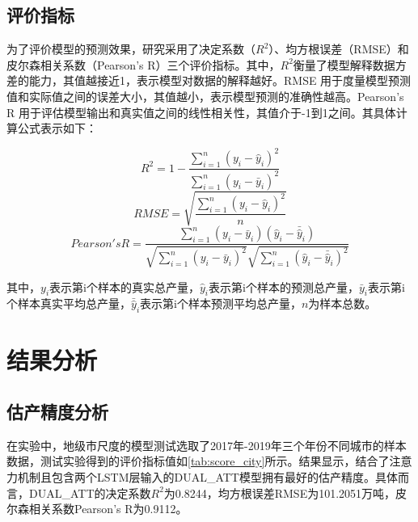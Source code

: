 \subsection{评价指标}

\par 为了评价模型的预测效果，研究采用了决定系数（$R^2$）、均方根误差（RMSE）和皮尔森相关系数（Pearson's R）三个评价指标。其中，$R^2$衡量了模型解释数据方差的能力，其值越接近1，表示模型对数据的解释越好。RMSE 用于度量模型预测值和实际值之间的误差大小，其值越小，表示模型预测的准确性越高。Pearson's R 用于评估模型输出和真实值之间的线性相关性，其值介于-1到1之间。其具体计算公式表示如下：

\begin{equation}
  \label{equ:R2}
  R^2=1-\frac{\sum_{i=1}^n (y_i-\hat{y}_i)^2}{\sum_{i=1}^n (y_i-\bar{y}_i)^2}
\end{equation}
\begin{equation}
  \label{equ:RMSE}
  RMSE=\sqrt{\frac{\sum_{i=1}^n (y_i-\hat{y}_i)^2}{n}}
\end{equation}
\begin{equation}
  \label{equ:Pearson}
  Pearson's R=\frac{\sum_{i=1}^n (y_i-\bar{y}_i)(\hat{y}_i-\bar{\hat{y}}_i)}{\sqrt{\sum_{i=1}^n (y_i-\bar{y}_i)^2}\sqrt{\sum_{i=1}^n (\hat{y}_i-\bar{\hat{y}}_i)^2}}
\end{equation}

\par 其中，$y_i$表示第i个样本的真实总产量，$\hat{y}_i$表示第i个样本的预测总产量，$\bar{y}_i$表示第i个样本真实平均总产量，$\bar{\hat{y}}_i$表示第i个样本预测平均总产量，$n$为样本总数。


\section{结果分析}
\subsection{估产精度分析}

\par 在实验中，地级市尺度的模型测试选取了2017年-2019年三个年份不同城市的样本数据，测试实验得到的评价指标值如\autoref{tab:score_city}所示。结果显示，结合了注意力机制且包含两个LSTM层输入的DUAL\_ATT模型拥有最好的估产精度。具体而言，DUAL\_ATT的决定系数$R^2$为0.8244，均方根误差RMSE为101.2051万吨，皮尔森相关系数Pearson's R为0.9112。

